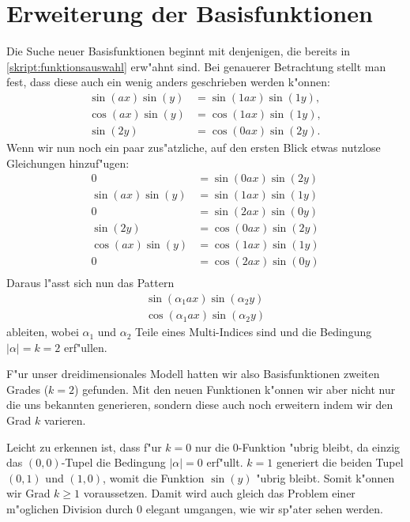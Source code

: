 \section{Erweiterung der Basisfunktionen\label{section:lorenz2:basic_function}}
Die Suche neuer Basisfunktionen beginnt mit denjenigen, die bereits 
in \cref{skript:funktionsauswahl} erw"ahnt sind. Bei genauerer Betrachtung 
stellt man fest, dass diese auch ein wenig anders geschrieben werden k"onnen:
\begin{align*}
\sin(ax)\sin(y) &= \sin(1ax)\sin(1y),\\
\cos(ax)\sin(y) &= \cos(1ax)\sin(1y),\\
\sin(2y) &= \cos(0ax)\sin(2y).
\end{align*}
Wenn wir nun noch ein paar zus"atzliche, auf den ersten Blick etwas nutzlose 
Gleichungen hinzuf"ugen:
\begin{align*}
0 &= \sin(0ax)\sin(2y) \\
\sin(ax)\sin(y) &= \sin(1ax)\sin(1y)\\
0 &= \sin(2ax)\sin(0y) \\
\sin(2y) &= \cos(0ax)\sin(2y)\\
\cos(ax)\sin(y) &= \cos(1ax)\sin(1y)\\
0 &= \cos(2ax)\sin(0y)\\
\end{align*}
Daraus l"asst sich nun das Pattern
\begin{equation}
\begin{split}
\sin(\alpha_1 ax)\sin(\alpha_2 y) \\
\cos(\alpha_1 ax)\sin(\alpha_2 y)
\end{split}
\label{equation:lorenz2:basic-functions}
\end{equation}
ableiten, wobei $\alpha_1$ und $\alpha_2$ Teile eines Multi-Indices sind und 
die Bedingung $|\alpha| = k = 2$ erf"ullen.

F"ur unser dreidimensionales Modell hatten wir also Basisfunktionen zweiten 
Grades ($k = 2$) gefunden. Mit den neuen Funktionen k"onnen wir aber nicht nur 
die uns bekannten generieren, sondern diese auch noch erweitern indem wir den 
Grad $k$ varieren.

Leicht zu erkennen ist, dass f"ur $k = 0$ nur die $0$-Funktion 
"ubrig bleibt, da einzig das $(0, 0)$-Tupel die Bedingung $|\alpha| = 0$ 
erf"ullt. $k = 1$ generiert die beiden Tupel $(0, 1)$ und $(1, 0)$, womit die 
Funktion $\sin(y)$ "ubrig bleibt. Somit k"onnen wir Grad $k \geq 1$ 
voraussetzen. Damit wird auch gleich das Problem einer m"oglichen Division 
durch $0$ elegant umgangen, wie wir sp"ater sehen werden.
